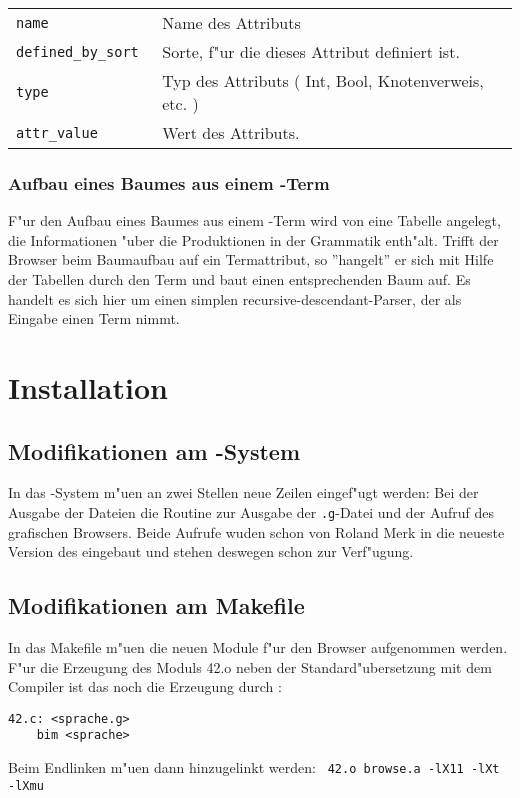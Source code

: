 	\begin{tabular}{ll}
	\tt name & Name des Attributs\\
	\tt defined\_by\_sort & Sorte, f"ur die dieses Attribut definiert ist.\\
	\tt type & Typ des Attributs ( Int, Bool, Knotenverweis, etc. )\\
	\tt attr\_value & Wert des Attributs.
	\end{tabular}
		
\subsubsection{Aufbau eines Baumes aus einem \MAX-Term}
    F"ur den Aufbau eines Baumes aus einem \MAX-Term wird von \BIM eine Tabelle
    angelegt, die Informationen "uber die Produktionen in der Grammatik enth"alt.
    Trifft der Browser beim Baumaufbau auf ein Termattribut, so ''hangelt'' er
    sich mit Hilfe der Tabellen durch den Term und baut einen entsprechenden
    Baum auf. Es handelt es sich hier um einen simplen recursive-descendant-Parser,
	der als Eingabe einen Term nimmt.
\section{Installation}
\subsection{Modifikationen am \MAX-System}
In das \MAX-System m"u\3en an zwei Stellen neue Zeilen eingef"ugt werden: Bei der
Ausgabe der Dateien die Routine zur Ausgabe der {\tt .g}-Datei und der Aufruf des
grafischen Browsers. Beide Aufrufe wuden schon von Roland Merk in die neueste Version
des \MAX eingebaut und stehen deswegen schon zur Verf"ugung.
\begin{appendix}
\subsection{Modifikationen am Makefile}
In das Makefile m"u\3en die neuen Module f"ur den Browser aufgenommen werden.
F"ur die Erzeugung des Moduls 42.o neben der Standard"ubersetzung mit dem Compiler
ist das noch die Erzeugung durch \BIM:\\
\begin{verbatim}
42.c: <sprache.g>
    bim <sprache>
\end{verbatim}
Beim Endlinken m"u\3en dann hinzugelinkt werden: \verb| 42.o browse.a -lX11 -lXt -lXmu|





\end{appendix}


